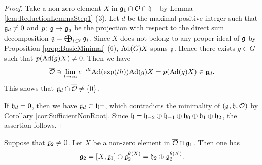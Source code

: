 \begin{proof}
	Take a non-zero element $X$ in $\mathfrak{g}_1\cap \overline{\mathcal{O}} \cap \mathfrak{h}^\perp$ by Lemma \ref{lem:ReductionLemmaStep1} (3).
	Let $d$ be the maximal positive integer such that $\mathfrak{g}_d \neq 0$ and $p\colon \mathfrak{g}\rightarrow \mathfrak{g}_d$ be the projection with respect to the direct sum decomposition $\mathfrak{g} = \bigoplus_{i \in \mathbb{Z}} \mathfrak{g}_i$.
	Since $X$ does not belong to any proper ideal of $\mathfrak{g}$ by Proposition \ref{prop:BasicMinimal} (6), $\mathrm{Ad}(G)X$ spans $\mathfrak{g}$.
	Hence there exists $g \in G$ such that $p(\mathrm{Ad}(g)X) \neq 0$.
	Then we have
	\begin{align*}
		\overline{\mathcal{O}} \ni \lim_{t \to \infty} e^{-dt} \mathrm{Ad}(\exp(th))\mathrm{Ad}(g)X = p(\mathrm{Ad}(g)X) \in \mathfrak{g}_d.
	\end{align*}
	This shows that $\mathfrak{g}_d \cap \overline{\mathcal{O}} \neq \left\{0 \right\}$.
	
	If $\mathfrak{h}_d = 0$, then we have $\mathfrak{g}_d \subset \mathfrak{h}^\perp$, which contradicts the minimality of $(\mathfrak{g}, \mathfrak{h}, \mathcal{O})$ by Corollary \ref{cor:SufficientNonRoot}.
	Since $\mathfrak{h} = \mathfrak{h}_{-2} \oplus \mathfrak{h}_{-1} \oplus \mathfrak{h}_0 \oplus \mathfrak{h}_1 \oplus \mathfrak{h}_2$, the assertion follows.
\end{proof}

\begin{lemma} \label{lem:ReductionLemmaStep3}
	Suppose that $\mathfrak{g}_2 \neq 0$.
	Let $X$ be a non-zero element in $\overline{\mathcal{O}} \cap \mathfrak{g}_1$.
	Then one has
	\begin{align*}
		\mathfrak{g}_2 = [X, \mathfrak{g}_1] \oplus \mathfrak{g}^{\theta(X)}_2 =  \mathfrak{h}_2 \oplus \mathfrak{g}^{\theta(X)}_2.
	\end{align*}
\end{lemma}

